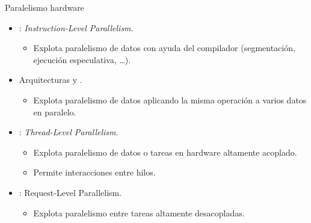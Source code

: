 \begin{frame}[t]{Paralelismo hardware}
\begin{itemize}
  \item {}: \emph{Instruction-Level Parallelism}.
    \begin{itemize}
      \item Explota paralelismo de datos con ayuda del compilador
      (segmentación, ejecución especulativa, \ldots).
    \end{itemize}

  \item Arquitecturas  y .
    \begin{itemize}
      \item Explota paralelismo de datos aplicando la misma operación
            a varios datos en paralelo.
    \end{itemize}

  \item {}: \emph{Thread-Level Parallelism}.
    \begin{itemize}
      \item Explota paralelismo de datos o tareas en hardware altamente acoplado.
      \item Permite interacciones entre hilos.
    \end{itemize}

  \item {}: Request-Level Parallelism.
    \begin{itemize}
      \item Explota paralelismo entre tareas altamente desacopladas.
    \end{itemize}
\end{itemize}
\end{frame}

